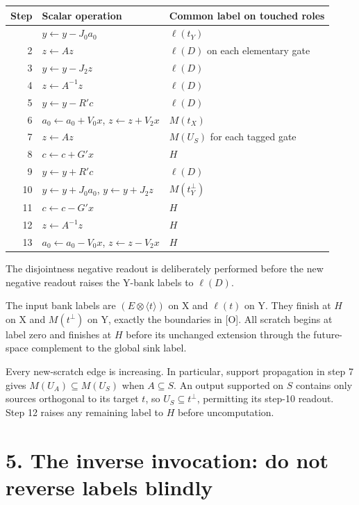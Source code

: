 \documentclass[
  11pt,
  letterpaper,
]{article}
\begin{document}
\begin{longtable}[]{@{}rll@{}}
\toprule\noalign{}
Step & Scalar operation & Common label on touched roles \\
\midrule\noalign{}
\endhead
\bottomrule\noalign{}
\endlastfoot
1 & \(y\leftarrow y-J_0 a_0\) & \(\ell(t_Y)\) \\
2 & \(z\leftarrow A z\) & \(\ell(D)\) on each elementary gate \\
3 & \(y\leftarrow y-J_2 z\) & \(\ell(D)\) \\
4 & \(z\leftarrow A^{-1} z\) & \(\ell(D)\) \\
5 & \(y\leftarrow y-R' c\) & \(\ell(D)\) \\
6 & \(a_0\leftarrow a_0+V_0 x\), \(z\leftarrow z+V_2 x\) & \(M(t_X)\) \\
7 & \(z\leftarrow A z\) & \(M(U_S)\) for each tagged gate \\
8 & \(c\leftarrow c+G' x\) & \(H\) \\
9 & \(y\leftarrow y+R' c\) & \(\ell(D)\) \\
10 & \(y\leftarrow y+J_0 a_0\), \(y\leftarrow y+J_2 z\) &
\(M(t_Y^\perp)\) \\
11 & \(c\leftarrow c-G' x\) & \(H\) \\
12 & \(z\leftarrow A^{-1} z\) & \(H\) \\
13 & \(a_0\leftarrow a_0-V_0 x\), \(z\leftarrow z-V_2 x\) & \(H\) \\
\end{longtable}

The disjointness negative readout is deliberately performed before the
new negative readout raises the Y-bank labels to \(\ell(D)\).

The input bank labels are \((E\otimes\langle t\rangle)\) on X and
\(\ell(t)\) on Y. They finish at \(H\) on X and \(M(t^\perp)\) on Y,
exactly the boundaries in {[}O{]}. All scratch begins at label zero and
finishes at \(H\) before its unchanged extension through the
future-space complement to the global sink label.

Every new-scratch edge is increasing. In particular, support propagation
in step 7 gives \(M(U_A)\subseteq M(U_S)\) when \(A\subseteq S\). An
output supported on \(S\) contains only sources orthogonal to its target
\(t\), so \(U_S\subseteq t^\perp\), permitting its step-10 readout. Step
12 raises any remaining label to \(H\) before uncomputation.

\section{5. The inverse invocation: do not reverse labels
blindly}\label{the-inverse-invocation-do-not-reverse-labels-blindly}
\end{document}
